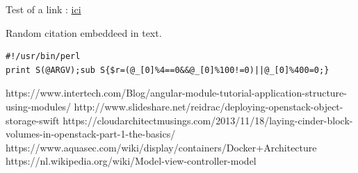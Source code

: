 \documentclass{article}
\begin{document}
Test of a link : \href{http://www.atec.com}{ici}

Random citation \cite{WEBSITE:1} embeddeed in text.

\begin{lstlisting}
#!/usr/bin/perl
print S(@ARGV);sub S{$r=(@_[0]%4==0&&@_[0]%100!=0)||@_[0]%400=0;}
\end{lstlisting}

\newpage



https://www.intertech.com/Blog/angular-module-tutorial-application-structure-using-modules/
http://www.slideshare.net/reidrac/deploying-openstack-object-storage-swift
https://cloudarchitectmusings.com/2013/11/18/laying-cinder-block-volumes-in-openstack-part-1-the-basics/
https://www.aquasec.com/wiki/display/containers/Docker+Architecture
https://nl.wikipedia.org/wiki/Model-view-controller-model
\end{document}
